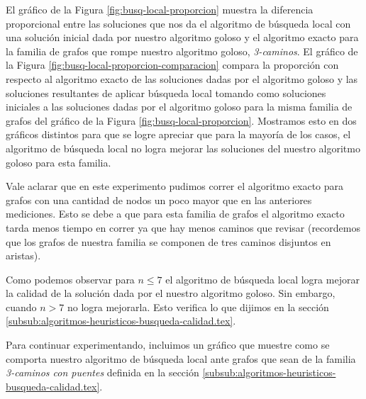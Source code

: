El gráfico de la Figura \ref{fig:busq-local-proporcion} muestra la diferencia proporcional entre las soluciones que nos da el algoritmo de búsqueda local con una solución inicial dada por nuestro algoritmo goloso y el algoritmo exacto para la familia de grafos que rompe nuestro algoritmo goloso, \emph{3-caminos}. El gráfico de la Figura \ref{fig:busq-local-proporcion-comparacion} compara la proporción con respecto al algoritmo exacto de las soluciones dadas por el algoritmo goloso y las soluciones resultantes de aplicar búsqueda local tomando como soluciones iniciales a las soluciones dadas por el algoritmo goloso para la misma familia de grafos del gráfico de la Figura \ref{fig:busq-local-proporcion}. Mostramos esto en dos gráficos distintos para que se logre apreciar que para la mayoría de los casos, el algoritmo de búsqueda local no logra mejorar las soluciones del nuestro algoritmo goloso para esta familia.

Vale aclarar que en este experimento pudimos correr el algoritmo exacto para grafos con una cantidad de nodos un poco mayor que en las anteriores mediciones. Esto se debe a que para esta familia de grafos el algoritmo exacto tarda menos tiempo en correr ya que hay menos caminos que revisar (recordemos que los grafos de nuestra familia se componen de tres caminos disjuntos en aristas).

Como podemos observar para $n \leq 7$ el algoritmo de búsqueda local logra mejorar la calidad de la solución dada por el nuestro algoritmo goloso. Sin embargo, cuando $n > 7$ no logra mejorarla. Esto verifica lo que dijimos en la sección \ref{subsub:algoritmos-heuristicos-busqueda-calidad.tex}.

Para continuar experimentando, incluimos un gráfico que muestre como se comporta nuestro algoritmo de búsqueda local ante grafos que sean de la familia \emph{3-caminos con puentes} definida en la sección \ref{subsub:algoritmos-heuristicos-busqueda-calidad.tex}. 

